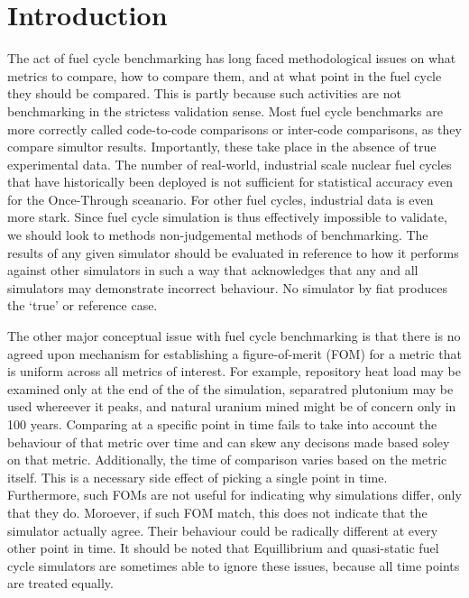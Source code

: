 \section{Introduction}
\label{intro}
The act of fuel cycle benchmarking has long faced methodological issues 
on what metrics to compare, how to compare them, and at what point in the
fuel cycle they should be compared. This is partly because such activities 
are not benchmarking in the strictess validation sense. Most fuel
cycle benchmarks are more correctly called code-to-code comparisons or 
inter-code comparisons, as they compare simultor results. Importantly, 
these take place in the absence of true experimental data. The number of 
real-world, industrial scale nuclear fuel cycles that have historically been 
deployed is not sufficient for statistical accuracy even for the Once-Through 
sceanario. For other fuel cycles, industrial data is even more stark. 
Since fuel cycle simulation is thus effectively impossible to validate, 
we should look to methods non-judgemental methods of benchmarking. The 
results of any given simulator should be evaluated in reference to how 
it performs against other simulators in such a way that acknowledges that 
any and all simulators may demonstrate incorrect behaviour. No simulator
by fiat produces the `true' or reference case.

The other major conceptual issue with fuel cycle benchmarking is that there 
is no agreed upon mechanism for establishing a figure-of-merit (FOM) for 
a metric that is uniform across all metrics of interest. For example, 
repository heat load may be examined only at the end of the of the simulation,
separatred plutonium may be used whereever it peaks, and natural uranium 
mined might be of concern only in 100 years. Comparing at a specific point 
in time fails to take into account the behaviour of that metric over time and 
can skew any decisons made based soley on that metric. Additionally, the 
time of comparison varies based on the metric itself. This is a necessary 
side effect of picking a single point in time.
Furthermore, such FOMs are not useful for indicating why simulations differ, 
only that they do. Moroever, if such FOM match, this does not indicate
that the simulator actually agree. Their behaviour could be radically 
different at every other point in time.  It should be noted that 
Equillibrium and quasi-static fuel cycle simulators are sometimes able to 
ignore these issues, because all time points are treated equally.

